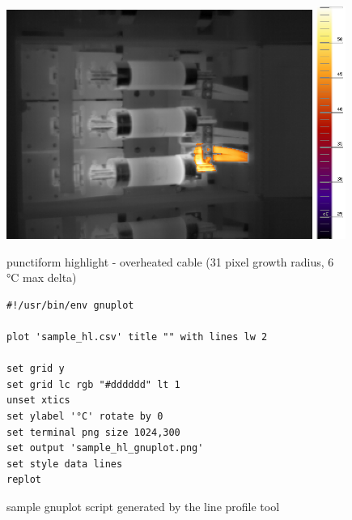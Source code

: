 \documentclass[12pt,twoside,a4paper,notitlepage]{report}
\begin{document}
\begin{figure}[ht]
 \centering
 \includegraphics[width=10cm, keepaspectratio=true]{img/FLIR_P60_hl_p}
 \includegraphics[width=9.5mm, keepaspectratio=true]{img/FLIR_P60_orig_scale}
 \caption{punctiform highlight - overheated cable (31 pixel growth radius, 6 °C max delta)}
 \label{fig:tools-export-punctiform}
\end{figure}


\begin{figure}[ht]
\begin{verbatim}
#!/usr/bin/env gnuplot

plot 'sample_hl.csv' title "" with lines lw 2

set grid y
set grid lc rgb "#dddddd" lt 1
unset xtics
set ylabel '°C' rotate by 0
set terminal png size 1024,300
set output 'sample_hl_gnuplot.png'
set style data lines
replot
\end{verbatim}
\caption{sample gnuplot script generated by the line profile tool}
\end{figure}
\end{document}
